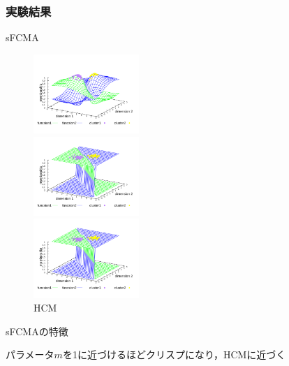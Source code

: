 \documentclass[13pt,dvipdfmx]{beamer}
\begin{document}
\begin{frame}\frametitle{実験結果}
  \begin{block}{sFCMA}
    \begin{figure}[htbp]
      \begin{minipage}{0.32\hsize}
        \begin{center}
          \includegraphics[width=40mm]{sFCMA-Em2.pdf}
        \end{center}
        \captionsetup{labelformat=empty,labelsep=none}
        \caption{$m=2.00$}
        \label{fig:one}
      \end{minipage}
      \begin{minipage}{0.32\hsize}
        \begin{center}
          \includegraphics[width=40mm]{sFCMA-Em11.pdf}
        \end{center}
        \captionsetup{labelformat=empty,labelsep=none}
        \caption{$m=1.01$}
        \label{fig:two}
      \end{minipage}
     \begin{minipage}{0.32\hsize}
        \begin{center}
          \includegraphics[width=40mm]{HCM.pdf}
        \end{center}
        \captionsetup{labelformat=empty,labelsep=none}
        \caption{HCM}
        \label{fig:three}
     \end{minipage}
    \end{figure}
  \end{block}
  \begin{block}{sFCMAの特徴}
    \begin{center}
      パラメータ$m$を1に近づけるほどクリスプになり，HCMに近づく
    \end{center}
  \end{block}
\end{frame}
\end{document}
